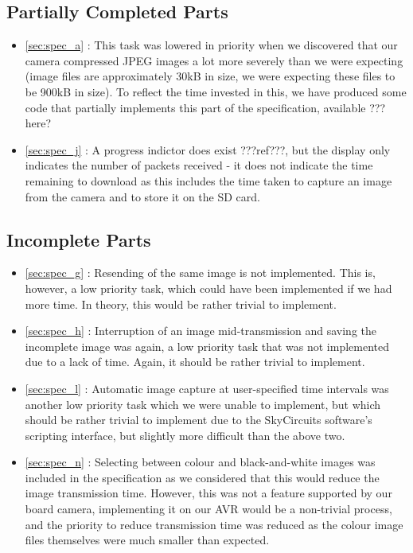 \subsection{Partially Completed Parts}

\begin{itemize}
\item \ref{sec:spec_a} : This task was lowered in priority when we discovered 
that our camera compressed JPEG images a lot more severely than we were 
expecting (image files are approximately 30kB in size, we were expecting 
these files to be 900kB in size). To reflect the time invested in this, we 
have produced some code that partially implements this part of the 
specification, available ???here?
\item \ref{sec:spec_j} : A progress indictor does exist ???ref???, but the 
display only indicates the number of packets received - it does not 
indicate the time remaining to download as this includes the time taken to 
capture an image from the camera and to store it on the SD card.
\end{itemize}

\subsection{Incomplete Parts}

\begin{itemize}
\item \ref{sec:spec_g} : Resending of the same image is not implemented. 
This is, however, a low priority task, which could have been implemented 
if we had more time. In theory, this would be rather trivial to implement.
\item \ref{sec:spec_h} : Interruption of an image mid-transmission and 
saving the incomplete image was again, a low priority task that was not 
implemented due to a lack of time. Again, it should be rather trivial to 
implement.
\item \ref{sec:spec_l} : Automatic image capture at user-specified time 
intervals was another low priority task which we were unable to implement, 
but which should be rather trivial to implement due to the SkyCircuits 
software's scripting interface, but slightly more difficult than the above
two.
\item \ref{sec:spec_n} : Selecting between colour and black-and-white images 
was included in the specification as we considered that this would reduce 
the image transmission time. However, this was not a feature supported 
by our board camera, implementing it on our AVR would be a non-trivial 
process, and the priority to reduce transmission time was reduced as the 
colour image files themselves were much smaller than expected.
\end{itemize}

